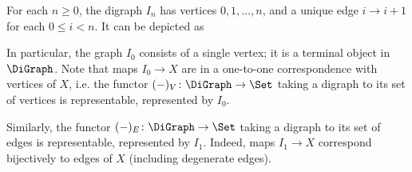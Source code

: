 \begin{defi}\label{def:I_n}
    For each $n\geq 0$, the digraph $I_n$ has vertices $0,1,\dots, n$, and a unique edge $i\to i+1$ for each $0\leq i<n$. It can be depicted as

    \begin{figure}[H]
    \centering
    \end{figure}
\end{defi}

In particular, the graph $I_0$ consists of a single vertex; it is a terminal object in $\DiGraph$.
Note that maps $I_0 \to X$ are in a one-to-one correspondence with vertices of $X$, i.e. the functor $(-)_V \colon \DiGraph \to \Set$ taking a digraph to its set of vertices is representable, represented by $I_0$.

Similarly, the functor $(-)_E \colon \DiGraph \to \Set$ taking a digraph to its set of edges is representable, represented by $I_1$.
Indeed, maps $I_1 \to X$ correspond bijectively to edges of $X$ (including degenerate edges).

